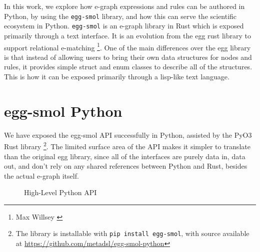 \documentclass[sigplan,screen,review]{acmart}
\begin{document}
In this work, we explore how e-graph expressions and rules can be authored in Python, by using the \verb|egg-smol| library, and how this can serve the scientific ecosystem in Python. \verb|egg-smol| is an e-graph library in Rust which is exposed primarily through a text interface. It is an evolution from the egg rust library \cite{Willsey2020eggFA} to support relational e-matching \cite{zhang2022relational} \footnote{ Max Willsey \cite{zulip}}. One of the main differences over the egg library is that instead of allowing users to bring their own data structures for nodes and rules, it provides simple struct and enum classes to describe all of the structures. This is how it can be exposed primarily through a lisp-like text language. 


\section{egg-smol Python}

We have exposed the egg-smol API successfully in Python, assisted by the PyO3 Rust library \cite{pyO3} \footnote{The library is installable with \verb+pip install egg-smol+, with source available at \url{https://github.com/metadsl/egg-smol-python}}. The limited surface area of the API makes it simpler to translate than the original egg library, since all of the interfaces are purely data in, data out, and don't rely on any shared references between Python and Rust, besides the actual e-graph itself.


 \begin{figure}
   \caption{High-Level Python API}
   
   \label{fig:high-level}
\end{figure}
\end{document}
